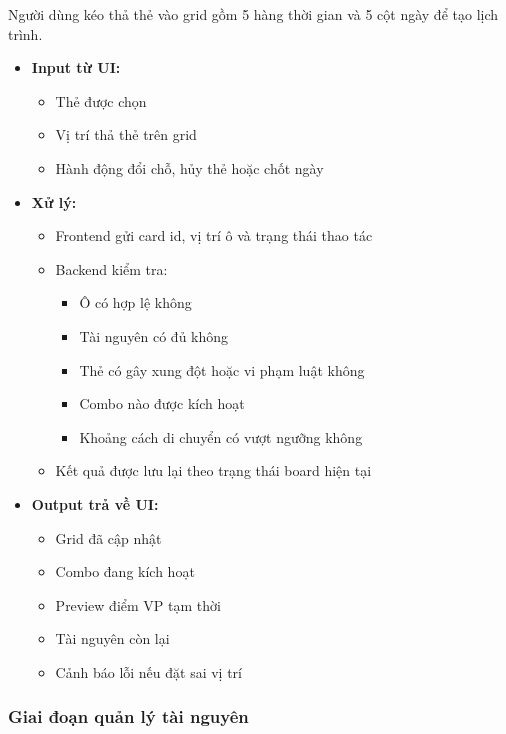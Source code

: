 Người dùng kéo thả thẻ vào grid gồm 5 hàng thời gian và 5 cột ngày để tạo lịch trình.

\begin{itemize}[topsep=0pt, itemsep=2.5pt, leftmargin=1.5cm]
    \item \textbf{Input từ UI:}
    \begin{itemize}[topsep=0pt, itemsep=2pt]
        \item Thẻ được chọn
        \item Vị trí thả thẻ trên grid
        \item Hành động đổi chỗ, hủy thẻ hoặc chốt ngày
    \end{itemize}

    \item \textbf{Xử lý:}
    \begin{itemize}[topsep=0pt, itemsep=2pt]
        \item Frontend gửi card id, vị trí ô và trạng thái thao tác
        \item Backend kiểm tra:
        \begin{itemize}[topsep=0pt, itemsep=1.5pt]
            \item Ô có hợp lệ không
            \item Tài nguyên có đủ không
            \item Thẻ có gây xung đột hoặc vi phạm luật không
            \item Combo nào được kích hoạt
            \item Khoảng cách di chuyển có vượt ngưỡng không
        \end{itemize}
        \item Kết quả được lưu lại theo trạng thái board hiện tại
    \end{itemize}

    \item \textbf{Output trả về UI:}
    \begin{itemize}[topsep=0pt, itemsep=2pt]
        \item Grid đã cập nhật
        \item Combo đang kích hoạt
        \item Preview điểm VP tạm thời
        \item Tài nguyên còn lại
        \item Cảnh báo lỗi nếu đặt sai vị trí
    \end{itemize}
\end{itemize}

\subsubsection{Giai đoạn quản lý tài nguyên}

